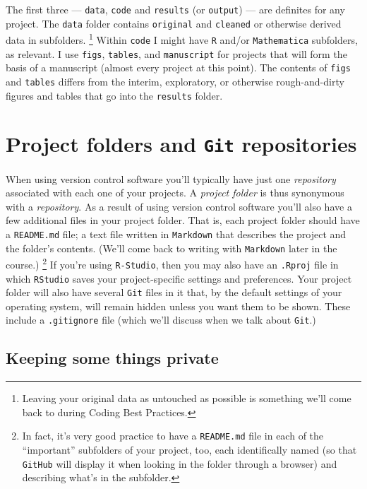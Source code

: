 \documentclass[12pt,letterpaper]{article}
\begin{document}
\noindent
The first three 
--- \texttt{data}, \texttt{code} and \texttt{results} (or \texttt{output}) ---
are definites for any project.
The \texttt{data} folder contains \texttt{original} and \texttt{cleaned} or otherwise derived data in subfolders.
\unskip
\footnote{Leaving your original data as untouched as possible is something we'll come back to during Coding Best Practices.} 
Within \texttt{code} I might have \texttt{R} and/or \texttt{Mathematica} subfolders, as relevant.
I use \texttt{figs}, \texttt{tables}, and \texttt{manuscript} for projects that will form the basis of a manuscript
(almost every project at this point).
The contents of \texttt{figs} and \texttt{tables} differs from the interim, exploratory, or otherwise rough-and-dirty figures and tables that go into the \texttt{results} folder.


\section{Project folders and \texttt{Git} repositories}

When using version control software you'll typically have just one \emph{repository} associated with each one of your projects.  
A \emph{project folder} is thus synonymous with a \emph{repository}.  
As a result of using version control software you'll also have a few additional files in your project folder.
That is, each project folder should have a \texttt{README.md} file; 
a text file written in \texttt{Markdown} that describes the project and the folder's contents.
(We'll come back to writing with \texttt{Markdown} later in the course.)
\unskip
\footnote{In fact, it's very good practice to have a \texttt{README.md} file in each of the ``important'' subfolders of your project, too, each identifically named (so that \texttt{GitHub} will display it when looking in the folder through a browser) and describing what's in the subfolder.}
If you're using \texttt{R-Studio}, 
then you may also have an \texttt{.Rproj} file in which \texttt{RStudio} saves your project-specific settings and preferences.  
Your project folder will also have several \texttt{Git} files in it that, 
by the default settings of your operating system, 
will remain hidden unless you want them to be shown.
These include a \texttt{.gitignore} file
(which we'll discuss when we talk about \texttt{Git}.)


\subsection{Keeping some things private}
\end{document}
